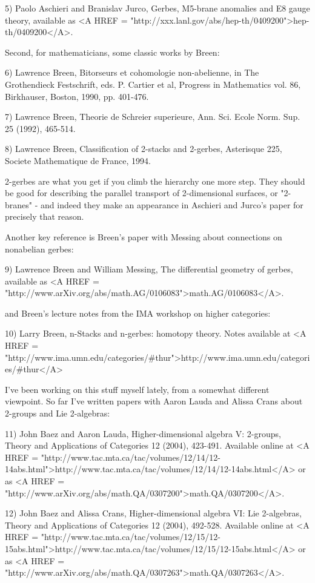 5) Paolo Aschieri and Branislav Jurco, Gerbes, M5-brane anomalies and
E8 gauge theory, available as <A HREF =
"http://xxx.lanl.gov/abs/hep-th/0409200">hep-th/0409200</A>.

Second, for mathematicians, some classic works by Breen:

6) Lawrence Breen, Bitorseurs et cohomologie non-abelienne,
in The Grothendieck Festschrift, eds. P. Cartier et al, Progress 
in Mathematics vol. 86, Birkhauser, Boston, 1990, pp. 401-476.

7) Lawrence Breen, Theorie de Schreier superieure, Ann. Sci. Ecole Norm.
Sup. 25 (1992), 465-514.

8) Lawrence Breen, Classification of 2-stacks and 2-gerbes, Asterisque
225, Societe Mathematique de France, 1994.

2-gerbes are what you get if you climb the hierarchy one more step.
They should be good for describing the parallel transport of 
2-dimensional surfaces, or "2-branes" - and indeed they make an 
appearance in Aschieri and Jurco's paper for precisely that reason.

Another key reference is Breen's paper with Messing about connections 
on nonabelian gerbes:

9) Lawrence Breen and William Messing, The differential geometry of gerbes,
available as <A HREF = "http://www.arXiv.org/abs/math.AG/0106083">math.AG/0106083</A>.

and Breen's lecture notes from the IMA workshop on higher categories:

10) Larry Breen, n-Stacks and n-gerbes: homotopy theory.
Notes available at <A HREF = "http://www.ima.umn.edu/categories/#thur">http://www.ima.umn.edu/categories/#thur</A>

I've been working on this stuff myself lately, from a somewhat different
viewpoint.  So far I've written papers with Aaron Lauda and Alissa Crans 
about 2-groups and Lie 2-algebras:

11) John Baez and Aaron Lauda, Higher-dimensional algebra V: 2-groups,
Theory and Applications of Categories 12 (2004), 423-491.  Available
online at <A HREF =
"http://www.tac.mta.ca/tac/volumes/12/14/12-14abs.html">http://www.tac.mta.ca/tac/volumes/12/14/12-14abs.html</A>
or as <A HREF =
"http://www.arXiv.org/abs/math.QA/0307200">math.QA/0307200</A>.

12) John Baez and Alissa Crans, Higher-dimensional algebra VI: Lie
2-algebras, Theory and Applications of Categories 12 (2004), 492-528.
Available online at <A HREF =
"http://www.tac.mta.ca/tac/volumes/12/15/12-15abs.html">http://www.tac.mta.ca/tac/volumes/12/15/12-15abs.html</A>
or as <A HREF =
"http://www.arXiv.org/abs/math.QA/0307263">math.QA/0307263</A>.

